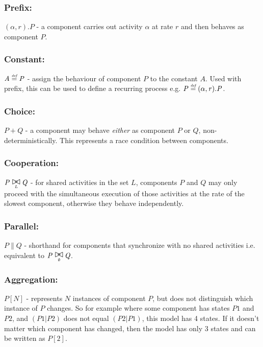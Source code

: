 \documentclass[runningheads]{llncs}
\begin{document}
\subsubsection{Prefix:} $(\mathit{\alpha},\mathit{r}).\mathit{P}$ - a component carries out activity $\mathit{\alpha}$ at rate $\mathit{r}$ and then behaves as component $\mathit{P}$.
\subsubsection{Constant:} $\mathit{A} \stackrel{\mbox{\em {\tiny def}}}{=} \mathit{P}$ - assign the behaviour of component $\mathit{P}$ to the constant $\mathit{A}$.  Used with prefix, this can be used to define a recurring process e.g. $\mathit{P} \stackrel{\mbox{\em {\tiny def}}}{=} (\mathit{\alpha},\mathit{r}).\mathit{P}$.
\subsubsection{Choice:} $\mathit{P} + \mathit{Q}$ - a component may behave {\itshape either} as component $\mathit{P}$ or $\mathit{Q}$, non-deterministically.  This represents a race condition between components.
\subsubsection{Cooperation:} $\mathit{P} \sync{L} \mathit{Q}$ - for shared activities in the set $\mathit{L}$, components $\mathit{P}$ and $\mathit{Q}$ may only proceed with the simultaneous execution of those activities at the rate of the slowest component, otherwise they behave independently.
\subsubsection{Parallel:} $\mathit{P} \parallel \mathit{Q}$ - shorthand for components that synchronize with no shared activities i.e. equivalent to $\mathit{P} \sync{\emptyset} \mathit{Q}$.
\subsubsection{Aggregation:} $\mathit{P}[N]$ - represents $\mathit{N}$ instances of component $\mathit{P}$, but does not distinguish which instance of $\mathit{P}$ changes.  So for example where some component has states $\mathit{P1}$ and $\mathit{P2}$, and $\mathit{(P1|P2)}$ does not equal $\mathit{(P2|P1)}$, this model has 4 states.  If it doesn't matter which component has changed, then the model has only 3 states and can be written as $\mathit{P}[2]$.
\end{document}
